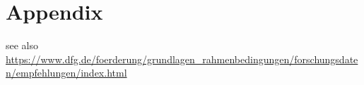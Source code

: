 \chapter{Appendix}
\label{chap:appendix}


see also \url{https://www.dfg.de/foerderung/grundlagen_rahmenbedingungen/forschungsdaten/empfehlungen/index.html}